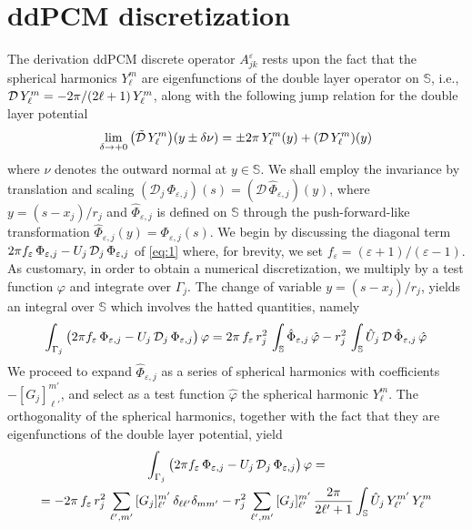 \section{ddPCM discretization\label{app:pcm}}
The derivation ddPCM discrete operator $A^\varepsilon_{jk}$ rests upon the fact that the spherical harmonics $Y_\ell^m$ are eigenfunctions of the double layer operator on $\mathbb{S}$, i.e., $\mathcal{D} \, Y_\ell^m =  -2\pi/ (2\ell+1) \,  Y_\ell^m$, along with the following jump relation for the double layer potential
\begin{equation}\label{eq:jump}
	\lim_{\delta \to + 0} \big(\tilde{\mathcal{D}} \, Y_\ell^m\big)(y \pm \delta \nu) =  \pm 2\pi \, Y_\ell^m(y)+ ( \mathcal{D} \, Y_\ell^m )(y)
\end{equation}
where $\nu$ denotes the outward normal at $y \in \mathbb{S}$. We shall employ the invariance by translation and scaling $(\mathcal{D}_j \, \Phi_{\varepsilon,j})(s) = (\mathcal{D} \, \hat{\Phi}_{\varepsilon,j})(y)$, where $y = (s - x_j)/r_j$ and $\hat{\Phi}_{\varepsilon,j}$ is defined on $\mathbb{S}$ through the push-forward-like transformation $\hat{\Phi}_{\varepsilon,j}(y) = \Phi_{\varepsilon,j}(s)$. We begin by discussing the diagonal term $2\pi f_\varepsilon \, \Phi_{\varepsilon,j} - U_j \, \mathcal{D}_j \, \Phi_{\varepsilon,j}$ of \eqref{eq:1} where, for brevity, we set $f_\varepsilon = (\varepsilon + 1)/(\varepsilon - 1)$. As customary, in order to obtain a numerical discretization, we multiply by a test function $\varphi$ and integrate over $\Gamma_j$.  The change of variable $y = (s- x_j)/r_j$, yields an integral over $\mathbb{S}$ which involves the hatted quantities, namely
\[
\int_{\Gamma_j} \big(2\pi f_\varepsilon \, \Phi_{\varepsilon,j}  - U_j \, \mathcal{D}_j \, \Phi_{\varepsilon,j} \big) \, \varphi = 2 \pi  \, f_\varepsilon \, r_j^2 \,\int_\mathbb{S} \hat{\Phi}_{\varepsilon,j}  \, \hat{\varphi} - r_j^2 \, \int_\mathbb{S} \hat{U}_j \, \mathcal{D} \, \hat{\Phi}_{\varepsilon,j}  \, \hat{\varphi}
\]
We proceed to expand $\hat{\Phi}_{\varepsilon,j}$ as a series of spherical harmonics with coefficients $-[G_j]_{\ell'}^{m'}$, and select as a test function $\hat{\varphi}$  the spherical harmonic $Y_{\ell}^{m}$. The orthogonality of the spherical harmonics, together with the fact that they are eigenfunctions of the double layer potential, yield
\begin{multline*}
\int_{\Gamma_j} \big(2\pi f_\varepsilon \, \Phi_{\varepsilon,j}  - U_j \, \mathcal{D}_j \, \Phi_{\varepsilon,j} \big) \, \varphi = \\
= - 2 \pi  \, f_\varepsilon \, r_j^2 \,\sum_{\ell',m'}  \, [G_j]_{\ell'}^{m'} \, \delta_{\ell \ell'} \delta_{mm'}  - r_j^2 \, \sum_{\ell',m'} \, [G_j]_{\ell'}^{m'} \, \frac{2\pi}{2\ell'+1} \int_{\mathbb{S}} \hat{U}_j \,  Y_{\ell'}^{m'}\, Y_\ell^m
\end{multline*}
